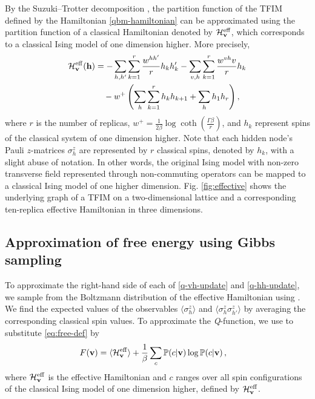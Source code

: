 \documentclass[pra,twocolumn,floatfix,superscriptaddress]{revtex4}
\newcommand{\eff}{\mathrm{eff}}
\begin{document}
By the Suzuki--Trotter decomposition \cite {suzuki1976relationship}, the partition function of the TFIM defined by the Hamiltonian \eqref{qbm-hamiltonian} can be approximated using the partition function of a classical Hamiltonian denoted by $\mathcal H^\eff_{\bold v}$, which corresponds to a classical Ising model of one dimension higher. More precisely, 
\begin{align}
\label{eff-hamiltonian}
\mathcal H_{\bold v}^\eff(\bold h)&=
-\sum_{h, h'}\sum_{k=1}^{r}\frac{w^{hh'}}{r}h_{k}h'_{k}
-\sum_{v, h} \sum_{k=1}^{r}\frac{w^{vh}v }{r}h_{k}\\
&\quad -w^+\left( \sum_{h} \sum_{k=1}^{r}h_{k}h_{k+1}+\sum_{h} h_{1}h_{r}\right),\nonumber
\end{align}
where $r$ is the number of replicas, $w^+ = \frac{1}{2\beta} \log \coth \left(\frac{\Gamma\beta}{r}\right)$, and $h_{k}$ represent spins of the classical system of one dimension higher. Note that each hidden node's Pauli $z$-matrices $\sigma_h^z$ are represented by $r$ classical spins, denoted by $h_k$, with a slight abuse of notation. In other words, the original Ising model with non-zero transverse field represented through non-commuting operators can be mapped to a classical Ising model of one higher dimension. Fig. \ref{fig:effective} shows the underlying graph of a TFIM on a two-dimensional lattice and a corresponding ten-replica effective Hamiltonian in three dimensions. 

\subsection{Approximation of free energy using Gibbs sampling}

To approximate the right-hand side of each of \eqref{q-vh-update} and \eqref{q-hh-update}, we sample from the Boltzmann distribution of the effective Hamiltonian using \cite[Theorem 6]{suzuki1976relationship}. We find the expected values of the observables $\langle\sigma_h^z\rangle$ and $\langle \sigma_h^z \sigma_{h'}^z \rangle$ by averaging the corresponding classical spin values. To approximate the \emph{Q}-function, we use \cite[Theorem 4]{suzuki1976relationship} to substitute \eqref{eq:free-def} by
\begin{align}
\label{freeen-eff}
&F (\bold{v}) = \langle \mathcal H^\eff_{\bold v} \rangle + 
\frac{1}\beta
\sum_{c}\mathbb{P}(c|\bold{v}) \log \mathbb{P}(c|\bold{v})\,,
\end{align}
where $\mathcal H^\eff_{\bold v}$ is the effective Hamiltonian and $c$ ranges over all spin configurations of the classical Ising model of one dimension higher, defined by $\mathcal H^\eff_{\bold v}$.
\end{document}
